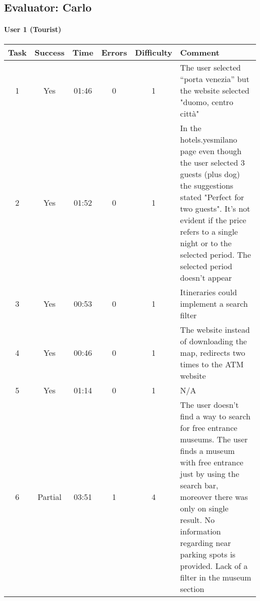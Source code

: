 \begin{small}
\pagebreak

\subsection{Evaluator: Carlo}

\paragraph{User 1 (Tourist)}
\begin{tabularx}{\linewidth}{c c c c c X}
    \toprule
    \textbf{Task} & \textbf{Success} & \textbf{Time}
     & \textbf{Errors} & \textbf{Difficulty} & \textbf{Comment} \\
    \midrule
    1 & Yes & 01:46 & 0 & 1 & The user selected “porta venezia” but the website selected "duomo, centro città" \\ \midrule
    2 & Yes & 01:52 & 0 & 1 & In the hotels.yesmilano page even though the user selected 3 guests (plus dog) the suggestions stated "Perfect for two guests". It's not evident if the price refers to a single night or to the selected period. The selected period doesn't appear \\ \midrule
    3 & Yes & 00:53 & 0 & 1 & Itineraries could implement a search filter \\ \midrule
    4 & Yes & 00:46 & 0 & 1 & The website instead of downloading the map, redirects two times to the ATM website \\ \midrule
    5 & Yes & 01:14 & 0 & 1 & N/A \\ \midrule
    6 & Partial & 03:51 & 1 & 4 & The user doesn't find a way to search for free entrance museums. The user finds a museum with free entrance just by using the search bar, moreover there was only on single result. No information regarding near parking spots is provided. Lack of a filter in the museum section \\ \bottomrule
\end{tabularx}


\end{small}
